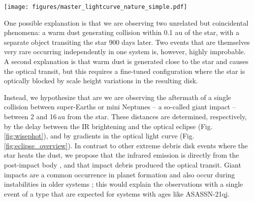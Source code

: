 \documentclass[sn-nature]{sn-jnl}%
\newcommand{\asas}{ASASSN-21qj}
\begin{document}
\begin{figure*}
\begin{centering}
\texttt{[image: figures/master\_lightcurve\_nature\_simple.pdf]}
      \caption{The light curve of ASASSN-21qj from several different photometric surveys and the derived transverse velocities.
      Panel {\bf a} shows that the eclipse depth is deeper for shorter wavelengths, indicating that the transiting material is dominated by sub-micron sized grains.
      Panel {\bf b} shows the  transverse velocities derived from the light curve gradients.
      These are lower limits to the true velocity, and thus imply that the transiting material is closer to the star than 16\,au.
      Error bars are shown at $1\sigma$ confidence.
      }
        \label{fig:eclipse_overview}
\end{centering}
\end{figure*}





One possible explanation is that we are observing two unrelated but coincidental phenomena: a warm dust generating collision within 0.1 au of the star, with a separate object transiting the star 900 days later.
%
Two events that are themselves very rare occurring independently in one system is, however, highly improbable.
%
A second explanation is that warm dust is generated close to the star and causes the optical transit, but this requires a fine-tuned configuration where the star is optically blocked by scale height variations in the resulting disk.

Instead, we hypothesize that are we are observing the aftermath of a single collision between super-Earths or mini Neptunes -- a so-called giant impact -- between 2 and 16\,au from the star. 
%
These distances are determined, respectively, by the delay between the IR brightening and the optical eclipse (Fig. \ref{fig:wisephot}), and by gradients in the optical light curve (Fig. \ref{fig:eclipse_overview}).
%
In contrast to other extreme debris disk events where the star heats the dust, we propose that the infrared emission is directly from the post-impact body \cite{Lock2017,2009ApJ...704..770M}, and that impact debris produced the optical transit.
%
Giant impacts are a common occurrence in planet formation \cite{Schlichting2018a,DAngelo2018} and also occur during instabilities in older systems \cite{Kaib2016}; this would explain the observations with a single event of a type that are expected for systems with ages like \asas{}.
\end{document}
